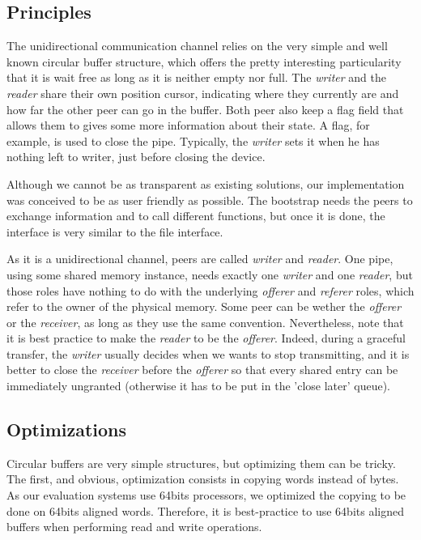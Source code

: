 \documentclass[journal]{IEEEtran}
\begin{document}
\subsection{Principles}

The unidirectional communication channel relies on the very simple and well known circular buffer structure, which offers the pretty interesting particularity that it is wait free as long as it is neither empty nor full. The \emph{writer} and the \emph{reader} share their own position cursor, indicating where they currently are and how far the other peer can go in the buffer. Both peer also keep a flag field that allows them to gives some more information about their state. A flag, for example, is used to close the pipe. Typically, the \emph{writer} sets it when he has nothing left to writer, just before closing the device. 

Although we cannot be as transparent as existing solutions, our implementation was conceived to be as user friendly as possible. The bootstrap needs the peers to exchange information and to call different functions, but once it is done, the interface is very similar to the file interface. 

As it is a unidirectional channel, peers are called \emph{writer} and \emph{reader}. One pipe, using some shared memory instance, needs exactly one \emph{writer} and one \emph{reader}, but those roles have nothing to do with the underlying \emph{offerer} and \emph{referer} roles, which refer to the owner of the physical memory. Some peer can be wether the \emph{offerer} or the \emph{receiver}, as long as they use the same convention. Nevertheless, note that it is best practice to make the \emph{reader} to be the \emph{offerer}. Indeed, during a graceful transfer, the \emph{writer} usually decides when we wants to stop transmitting, and it is better to close the \emph{receiver} before the \emph{offerer} so that every shared entry can be immediately ungranted (otherwise it has to be put in the 'close later' queue).



\subsection{Optimizations}

Circular buffers are very simple structures, but optimizing them can be tricky. The first, and obvious, optimization consists in copying words instead of bytes. As our evaluation systems use 64bits processors, we optimized the copying to be done on 64bits aligned words. Therefore, it is best-practice to use 64bits aligned buffers when performing read and write operations. 
\end{document}
